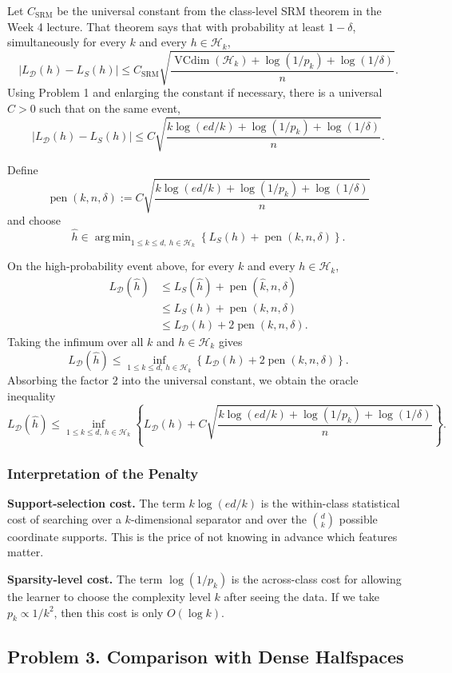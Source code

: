\documentclass{article}
\DeclareMathOperator{\VC}{VCdim}
\DeclareMathOperator*{\argmin}{arg\,min}
\newcommand{\cH}{\mathcal{H}}
\newcommand{\cD}{\mathcal{D}}
\begin{document}
Let $C_{\mathrm{SRM}}$ be the universal constant from the class-level SRM theorem in the Week 4 lecture. That theorem says that with probability at least $1-\delta$, simultaneously for every $k$ and every $h\in\cH_k$,
$$
\left|L_{\cD}(h)-L_S(h)\right|
\le
C_{\mathrm{SRM}}
\sqrt{
\frac{
\VC(\cH_k)+\log(1/p_k)+\log(1/\delta)
}{n}
}.
$$
Using Problem 1 and enlarging the constant if necessary, there is a universal $C>0$ such that on the same event,
$$
\left|L_{\cD}(h)-L_S(h)\right|
\le
C
\sqrt{
\frac{
k\log(ed/k)+\log(1/p_k)+\log(1/\delta)
}{n}
}.
$$

Define
$$
\operatorname{pen}(k,n,\delta)
:=
C
\sqrt{
\frac{
k\log(ed/k)+\log(1/p_k)+\log(1/\delta)
}{n}
}
$$
and choose
$$
\widehat{h}
\in
\argmin_{1\le k\le d,\ h\in\cH_k}
\left\{
L_S(h)+\operatorname{pen}(k,n,\delta)
\right\}.
$$

On the high-probability event above, for every $k$ and every $h\in\cH_k$,
\begin{align*}
L_{\cD}(\widehat{h})
&\le
L_S(\widehat{h})+\operatorname{pen}(\widehat{k},n,\delta) \\
&\le
L_S(h)+\operatorname{pen}(k,n,\delta) \\
&\le
L_{\cD}(h)+2\operatorname{pen}(k,n,\delta).
\end{align*}
Taking the infimum over all $k$ and $h\in\cH_k$ gives
$$
L_{\cD}(\widehat{h})
\le
\inf_{1\le k\le d,\ h\in\cH_k}
\left\{
L_{\cD}(h)+2\operatorname{pen}(k,n,\delta)
\right\}.
$$
Absorbing the factor $2$ into the universal constant, we obtain the oracle inequality
$$
L_{\cD}(\widehat{h})
\le
\inf_{1\le k\le d,\ h\in\cH_k}
\left\{
L_{\cD}(h)
+
C
\sqrt{
\frac{
k\log(ed/k)+\log(1/p_k)+\log(1/\delta)
}{n}
}
\right\}.
$$

\subsubsection{Interpretation of the Penalty}

\textbf{Support-selection cost.}
The term $k\log(ed/k)$ is the within-class statistical cost of searching over a $k$-dimensional separator and over the $\binom{d}{k}$ possible coordinate supports. This is the price of not knowing in advance which features matter.

\textbf{Sparsity-level cost.}
The term $\log(1/p_k)$ is the across-class cost for allowing the learner to choose the complexity level $k$ after seeing the data. If we take $p_k \propto 1/k^2$, then this cost is only $O(\log k)$.

\subsection{Problem 3. Comparison with Dense Halfspaces}
\end{document}

